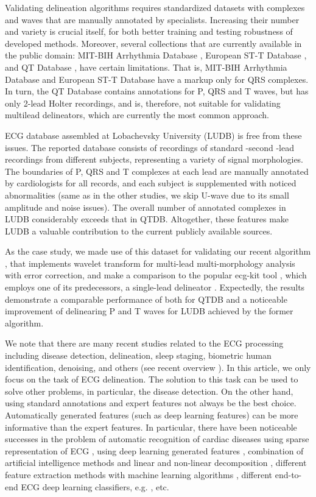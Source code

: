 \documentclass[submitted]{ieeeaccess}
\newcommand{\NewCorrection}[1]{{#1}}
\begin{document}
Validating delineation algorithms requires standardized datasets with complexes and waves that are manually annotated by specialists. Increasing their number and variety is crucial itself, for both better training and testing robustness of developed methods. Moreover, several collections that are currently available in the public domain: MIT-BIH Arrhythmia Database \cite{mitdb}, European ST-T Database \cite{edb}, and QT Database \cite{qtdb}, have certain limitations. That is, MIT-BIH Arrhythmia Database and European ST-T Database have a markup only for QRS complexes. In turn, the QT Database contains annotations for P, QRS and T waves, but has only 2-lead Holter recordings, and is, therefore, not suitable for validating multilead delineators, which are currently the most common approach.   


ECG database assembled at Lobachevsky University (LUDB) is free from these issues. The reported database consists of  recordings of standard -second -lead recordings \cite{IEC} from different subjects, representing a variety of signal morphologies. The boundaries of P, QRS and T complexes at each lead are manually annotated by cardiologists for all  records, and each subject is supplemented with noticed abnormalities (same as in the other studies, we skip U-wave due to its small amplitude and noise issues). The overall number of annotated complexes in LUDB considerably exceeds that in QTDB. Altogether, these features make LUDB a valuable contribution to the current publicly available sources. 

As the case study, we made use of this dataset for validating our recent algorithm \cite{Kalyakulina2018}, that implements wavelet transform for multi-lead multi-morphology analysis with error correction, and make a comparison to the popular ecg-kit tool \cite{ECGKit}, which employs one of its predecessors, a single-lead delineator \cite{Martinez2004}. Expectedly, the results demonstrate a comparable performance of both for \NewCorrection{QTDB} and a noticeable improvement of delinearing P and T waves for LUDB \NewCorrection{achieved} by the former algorithm. 

\NewCorrection{We note that there are many recent studies related to the ECG processing including disease detection, delineation, sleep staging, biometric human identification, denoising, and others (see recent overview \cite{Hong2020}). In this article, we only focus on the task of ECG delineation. 
The solution to this task can be used to solve other problems, in particular, the disease detection. On the other hand, using standard annotations and expert features not always be the best choice. Automatically generated features (such as deep learning features) can be more informative than the expert features. In particular, there have been noticeable successes in the problem of automatic recognition of cardiac diseases using sparse representation of ECG \cite{RajRay2018}, using deep learning generated features \cite{Hong2017,Hong2019}, combination of artificial intelligence methods and linear and non-linear decomposition \cite{Abdalla2019}, different feature extraction methods with machine learning algorithms \cite{Marinho2019}, different end-to-end ECG deep learning classifiers, e.g. \cite{Xu2018,Hannun2019}, etc.}
\end{document}
